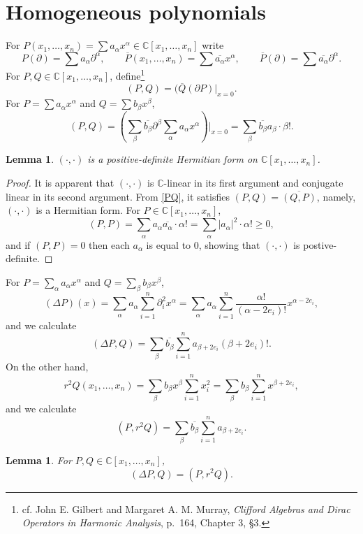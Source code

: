 \documentclass{article}
\newtheorem{lemma}[theorem]{Lemma}
\theoremstyle{definition}
\begin{document}
\section{Homogeneous polynomials}
For $P(x_1,\ldots,x_n) = \sum a_\alpha x^\alpha \in \mathbb{C}[x_1,\ldots,x_n]$ write
\[
P(\partial) = \sum a_\alpha \partial^\alpha,\qquad \overline{P}(x_1,\ldots,x_n) = \sum \overline{a_\alpha} x^\alpha,
\qquad \overline{P}(\partial) = \sum \overline{a_\alpha} \partial^\alpha.
\]
For $P,Q \in \mathbb{C}[x_1,\ldots,x_n]$, define\footnote{cf. 
John E. Gilbert and Margaret A. M. Murray, 
{\em Clifford Algebras and Dirac Operators in Harmonic Analysis},
p.~164, Chapter 3, \S 3.}
\[
(P,Q) = (\overline{Q}(\partial P) \Big|_{x=0}.
\]
For $P=\sum a_\alpha x^\alpha$ and $Q=\sum b_\beta x^\beta$,
\begin{equation}
(P,Q)=
\left( \sum_\beta \overline{b_\beta} \partial^\beta \sum_\alpha a_\alpha x^\alpha\right) \Big|_{x=0}
=\sum_\beta \overline{b_\beta} a_\beta \cdot \beta!.
\label{PQ}
\end{equation}

\begin{lemma}
$(\cdot,\cdot)$ is a positive-definite Hermitian form on $\mathbb{C}[x_1,\ldots,x_n]$.
\end{lemma}
\begin{proof}
It is apparent that $(\cdot,\cdot)$ is $\mathbb{C}$-linear in its first argument and conjugate linear in its
second argument. From \eqref{PQ}, it satisfies $(P,Q)=\overline{(Q,P)}$, namely, $(\cdot,\cdot)$ is a 
Hermitian form.
For $P \in \mathbb{C}[x_1,\ldots,x_n]$,
\[
(P,P) = \sum_\alpha a_\alpha \overline{a_\alpha} \cdot \alpha! = \sum_\alpha |a_\alpha|^2 \cdot \alpha!
\geq 0,
\]
and if $(P,P)=0$ then each $a_\alpha$ is equal to $0$, showing that $(\cdot,\cdot)$ is postive-definite.
\end{proof}

For $P=\sum_\alpha a_\alpha x^\alpha$ and $Q=\sum_\beta b_\beta x^\beta$,
\[
(\Delta P)(x)=\sum_\alpha a_\alpha \sum_{i=1}^n \partial_i^2 x^\alpha
=\sum_\alpha a_\alpha \sum_{i=1}^n \frac{\alpha!}{(\alpha-2e_i)!} x^{\alpha-2e_i},
\]
and we calculate
\[
(\Delta P,Q) = \sum_{\beta} \overline{b_\beta} \sum_{i=1}^n a_{\beta+2e_i} (\beta+2e_i)!.
\]
On the other hand,
\[
r^2Q(x_1,\ldots,x_n) = \sum_\beta b_\beta x^\beta \sum_{i=1}^n x_i^2
= \sum_\beta b_\beta \sum_{i=1}^n x^{\beta+2e_i},
\]
and we calculate
\[
(P,r^2Q)=\sum_\beta \overline{b_\beta} \sum_{i=1}^n a_{\beta+2e_i}.
\]

\begin{lemma}
For $P,Q \in \mathbb{C}[x_1,\ldots,x_n]$, 
\[
(\Delta P,Q) = (P,r^2Q).
\]
\label{rQ}
\end{lemma}
\end{document}
